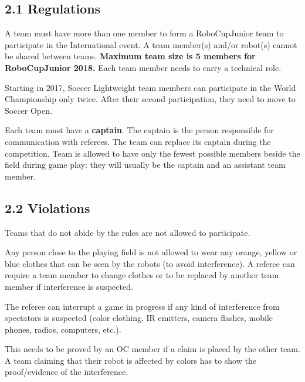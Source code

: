 \documentclass{article}
\begin{document}
\subsection{2.1 Regulations \label{ref-016}}

A team \textcolor{color-5}{must} have more than one member to form a RoboCupJunior team to participate in the International event. A team member(s) and/or robot(s) cannot be shared between teams. \textbf{\textcolor{color-5}{Maximum team size is 5 members for RoboCupJunior 2018.}} \textcolor{color-5}{Each team member needs to carry a technical role.}

\textcolor{color-5}{Starting in 2017, Soccer Lightweight team members can participate in the World Championship only twice. After their second participation, they need to move to Soccer Open.} 

Each team must have a \textbf{captain}. The captain is the person responsible for communication with referees. The team can replace its captain during the competition. Team is allowed to have only the fewest possible members beside the field during game play: they will usually be the captain and an assistant team member.

\subsection{2.2 Violations \label{ref-017}}

Teams that do not abide by the rules are not allowed to participate.

 

Any person close to the playing field is not allowed to wear any orange, yellow or blue clothes that can be seen by the robots (to avoid interference). A referee can require a team member to change clothes or to be replaced by another team member if interference is suspected. 

The referee can interrupt a game in progress if any kind of interference from spectators is suspected (color clothing, IR emitters, camera flashes, mobile phones, radios, computers, etc.).

This needs to be proved by an OC member if a claim is placed by the other team. A team claiming that their robot is affected by colors has to show the proof/evidence of the interference.
\end{document}
